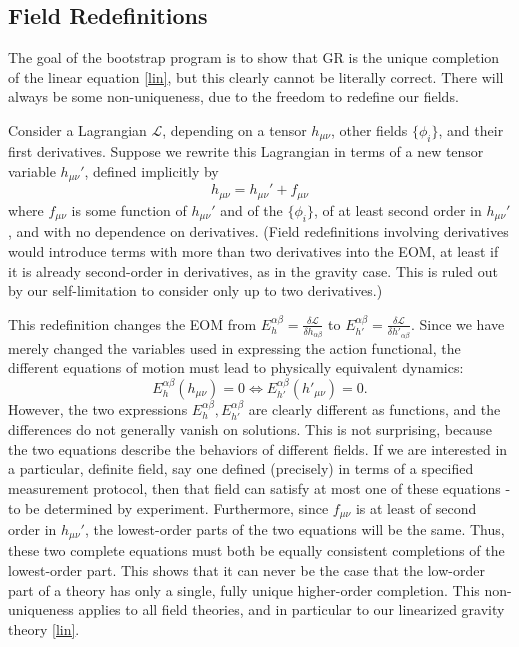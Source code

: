 \documentclass[aps,physrev,preprint,groupedaddress]{revtex4-2}
\begin{document}
\subsection{Field Redefinitions}
The goal of the bootstrap program is to show that GR is the unique completion of the linear equation \eqref{lin}, but this clearly cannot be literally correct. There will always be some non-uniqueness, due to the freedom to redefine our fields. 

Consider a Lagrangian \(\mathcal{L}\),  depending on a tensor \(h_{\mu\nu}\), other fields \(\{\phi_i\}\), and their first derivatives. Suppose we rewrite this Lagrangian in terms of a new tensor variable \(h_{\mu\nu}'\), defined implicitly by 
\begin{equation}
    h_{\mu\nu}=h_{\mu\nu}'+f_{\mu\nu}
\end{equation}
where \(f_{\mu\nu}\) is some function of \(h_{\mu\nu}'\) and of the \(\{\phi_i\}\), of at least second order in \(h_{\mu\nu}'\), and with no dependence on derivatives. (Field redefinitions involving derivatives would introduce terms with more than two derivatives into the EOM, at least if it is already second-order in derivatives, as in the gravity case. This is ruled out by our self-limitation to consider only up to two derivatives.) 

This redefinition changes the EOM from \(E_h^{\alpha\beta}=\frac{\delta\mathcal{L}}{\delta h_{\alpha\beta}}\) to \(E_{h'}^{\alpha\beta}=\frac{\delta\mathcal{L}}{\delta h'_{\alpha\beta}}\). Since we have merely changed the variables used in expressing the action functional, the different equations of motion must lead to physically equivalent dynamics: 
\begin{equation}
E_h^{\alpha\beta}(h_{\mu\nu})=0 \Leftrightarrow E_{h'}^{\alpha\beta}(h'_{\mu\nu})=0.
\end{equation}
However, the two expressions \(E_h^{\alpha\beta},E_{h'}^{\alpha\beta}\) are clearly different as functions, and the differences do not generally vanish on solutions. This is not surprising, because the two equations describe the behaviors of different fields. If we are interested in a particular, definite field, say one defined (precisely) in terms of a specified measurement protocol, then that field can satisfy at most one of these equations - to be determined by experiment. Furthermore, since \(f_{\mu\nu}\) is at least of second order in \(h_{\mu\nu}'\), the lowest-order parts of the two equations will be the same. Thus, these two complete equations must both be equally consistent completions of the lowest-order part.  This shows that it can never be the case that the low-order part of a theory has only a single, fully unique higher-order completion. This non-uniqueness applies to all field theories, and in particular to our linearized gravity theory \eqref{lin}.
\end{document}
